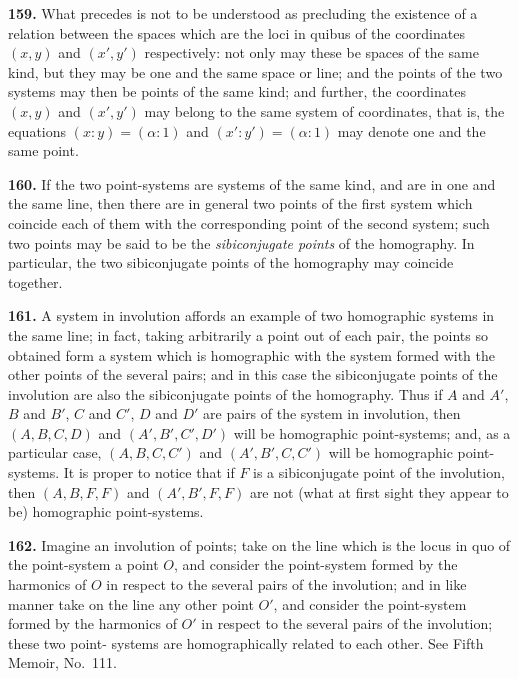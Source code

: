 \documentclass[11pt,a4paper]{book}
\begin{document}
\begin{center}
\textbf{159.} What precedes is not to be understood as precluding the existence of a
relation between the spaces which are the loci in quibus of the coordinates $(x,y)$ and
$(x',y')$ respectively: not only may these be spaces of the same kind, but they may
be one and the same space or line; and the points of the two systems may then be
points of the same kind; and further, the coordinates $(x,y)$ and $(x',y')$ may belong to
the same system of coordinates, that is, the equations $(x:y)=(\alpha:1)$ and
$(x':y')=(\alpha:1)$ may denote one and the same point.

\textbf{160.} If the two point-systems are systems of the same kind, and are in one
and the same line, then there are in general two points of the first system which
coincide each of them with the corresponding point of the second system; such two
points may be said to be the \textit{sibiconjugate points} of the homography. In particular,
the two sibiconjugate points of the homography may coincide together.

\textbf{161.} A system in involution affords an example of two homographic systems in
the same line; in fact, taking arbitrarily a point out of each pair, the points so
obtained form a system which is homographic with the system formed with the other
points of the several pairs; and in this case the sibiconjugate points of the involution
are also the sibiconjugate points of the homography. Thus if $A$ and $A'$, $B$ and $B'$,
$C$ and $C'$, $D$ and $D'$ are pairs of the system in involution, then $(A,B,C,D)$ and
$(A',B',C',D')$ will be homographic point-systems; and, as a particular case,
$(A,B,C,C')$ and $(A',B',C,C')$ will be homographic point-systems. It is proper
to notice that if $F$ is a sibiconjugate point of the involution, then $(A,B,F,F)$ and
$(A',B',F,F)$ are not (what at first sight they appear to be) homographic point-systems.

\textbf{162.} Imagine an involution of points; take on the line which is the locus in
quo of the point-system a point $O$, and consider the point-system formed by the
harmonics of $O$ in respect to the several pairs of the involution; and in like manner
take on the line any other point $O'$, and consider the point-system formed by the
harmonics of $O'$ in respect to the several pairs of the involution; these two point-
systems are homographically related to each other. See Fifth Memoir, No.~111.


\end{center}
\end{document}
